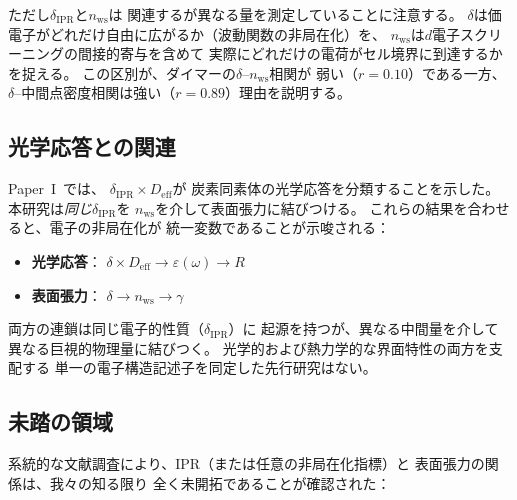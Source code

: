 \documentclass[twocolumn,showpacs,preprintnumbers,amsmath,amssymb,prb]{revtex4-2}
\begin{document}
ただし$\delta_\mathrm{IPR}$と$n_\mathrm{ws}$は
関連するが異なる量を測定していることに注意する。
$\delta$は価電子がどれだけ自由に広がるか（波動関数の非局在化）を、
$n_\mathrm{ws}$は$d$電子スクリーニングの間接的寄与を含めて
実際にどれだけの電荷がセル境界に到達するかを捉える。
この区別が、ダイマーの$\delta$--$n_\mathrm{ws}$相関が
弱い（$r = 0.10$）である一方、
$\delta$--中間点密度相関は強い（$r = 0.89$）理由を説明する。

\subsection{光学応答との関連}

Paper~I~\cite{SentoOpticsPaper1}では、
$\delta_\mathrm{IPR} \times D_\mathrm{eff}$が
炭素同素体の光学応答を分類することを示した。
本研究は\emph{同じ}$\delta_\mathrm{IPR}$を
$n_\mathrm{ws}$を介して表面張力に結びつける。
これらの結果を合わせると、電子の非局在化が
統一変数であることが示唆される：

\begin{itemize}
  \item \textbf{光学応答}：
    $\delta \times D_\mathrm{eff} \to \varepsilon(\omega) \to R$
  \item \textbf{表面張力}：
    $\delta \to n_\mathrm{ws} \to \gamma$
\end{itemize}

両方の連鎖は同じ電子的性質（$\delta_\mathrm{IPR}$）に
起源を持つが、異なる中間量を介して
異なる巨視的物理量に結びつく。
光学的および熱力学的な界面特性の両方を支配する
単一の電子構造記述子を同定した先行研究はない。

\subsection{未踏の領域}

系統的な文献調査により、IPR（または任意の非局在化指標）と
表面張力の関係は、我々の知る限り
全く未開拓であることが確認された：
\end{document}
